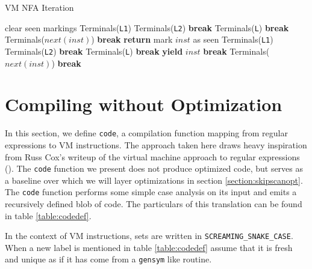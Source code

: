 \begin{algorithm}
\caption{VM NFA Iteration} \label{algo:nfaiter}
\begin{algorithmic}
  \State clear seen markings
      \State Terminals({\tt L1})
      \State Terminals({\tt L2})
      \State \textbf{break}
    \EndCase
      \State Terminals({\tt L})
      \State \textbf{break}
    \EndCase
     \EndCase
     \EndCase
      \State Terminals($next(inst)$)
      \State \textbf{break}
    \EndCase
  \EndSwitch
\EndProcedure
{}
    \State \textbf{return}
  \EndIf
  \State mark $inst$ as seen
      \State Terminals({\tt L1})
      \State Terminals({\tt L2})
      \State \textbf{break}
    \EndCase
      \State Terminals({\tt L})
      \State \textbf{break}
    \EndCase
     \EndCase
      \State \textbf{yield} $inst$
      \State \textbf{break}
    \EndCase
      \State Terminals($next(inst)$)
      \State \textbf{break}
    \EndCase
  \EndSwitch
\EndProcedure
\end{algorithmic}
\end{algorithm}

\section{Compiling without Optimization}
\label{section:compilation}

In this section, we define \verb'code', a compilation function mapping
from regular expressions to VM instructions. The approach taken here
draws heavy inspiration from Russ Cox's writeup of the virtual machine
approach to regular expressions (\cite{CoxVirtualMachineApproach}).
The \verb'code' function we present does not produce optimized code,
but serves as a baseline over which we will layer optimizations
in section \ref{section:skipscanopt}.
The \verb'code' function performs some simple case analysis on its
input and emits a recursively defined blob of code.
The particulars of this translation can
be found in table \ref{table:codedef}.

In the context of VM instructions, sets are written in
\texttt{SCREAMING\allowbreak\_SNAKE\allowbreak\_CASE}.
When a new label is mentioned in table
\ref{table:codedef} assume that it is fresh and unique as if it has
come from a \verb'gensym' like routine.

